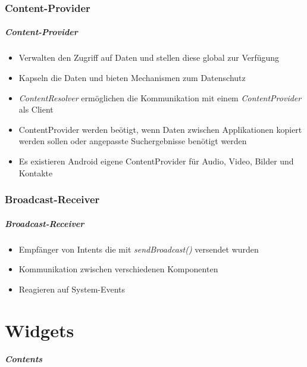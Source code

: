 \section{Content-Provider}
\begin{frame}[label=content_provider]
   \frametitle{Content-Provider}
   \begin{itemize}
      \item Verwalten den Zugriff auf Daten und stellen diese global zur Verfügung
      \item Kapseln die Daten und bieten Mechanismen zum Datenschutz
      \item \emph{ContentResolver} ermöglichen die Kommunikation mit 
         einem \emph{ContentProvider} als Client
      \item ContentProvider werden beötigt, wenn Daten zwischen Applikationen 
         kopiert werden sollen oder angepasste Suchergebnisse benötigt werden
      \item Es existieren Android eigene ContentProvider für Audio, Video, 
         Bilder und Kontakte
   \end{itemize}
\end{frame}

\section{Broadcast-Receiver}
\begin{frame}[label=broadcast_receiver]
   \frametitle{Broadcast-Receiver}
   \begin{itemize}
      \item Empfänger von Intents die mit \emph{sendBroadcast()} versendet wurden
      \item Kommunikation zwischen verschiedenen Komponenten
      \item Reagieren auf System-Events
   \end{itemize}

   

   
\end{frame}

\part{Widgets}
\frame{\partpage}
\begin{frame}
	\frametitle{Contents}
	\tableofcontents[]
\end{frame}

